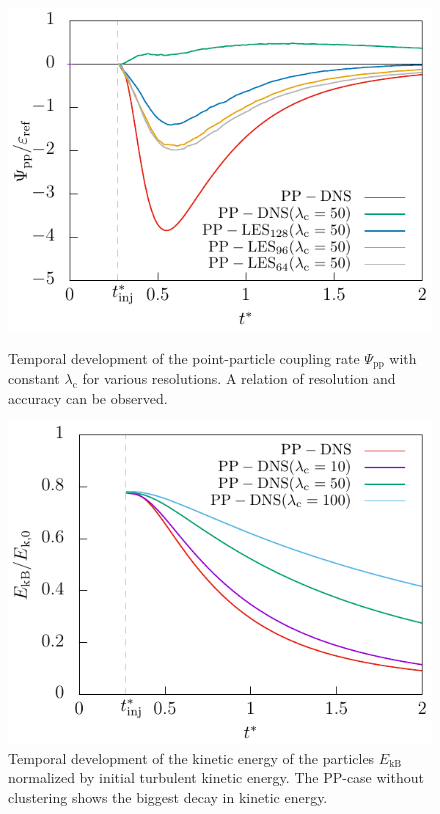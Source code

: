 \documentclass[11pt,a4paper,openany,oneside,parskip=half*]{article}
\begin{document}
\begin{figure}[]
    \centering
     \begin{minipage}[t]{0.5\textwidth}
        \centering
        \includegraphics[width=\linewidth]{./Abbildungen/vergleich_coupling_time50.pdf}
        \caption{Temporal development of the point-particle coupling rate $\Psi_\mathrm{pp}$ with constant $\lambda_\mathrm{c}$ for various resolutions. A relation of resolution and accuracy can be observed.}
        \label{vergleich_coupling_time_256}
        \end{minipage}%
    \begin{minipage}[t]{.5\textwidth}
         \centering
        \includegraphics[width=\linewidth]{./Abbildungen/256/particlekineticenergy_time.pdf}
        \caption{Temporal development of the kinetic energy of the particles $E_\mathrm{kB}$ normalized by initial turbulent kinetic energy. The PP-case without clustering shows the biggest decay in kinetic energy. }
        \label{particlekineticenergy_time_256}
    \end{minipage}
\end{figure}
\end{document}
